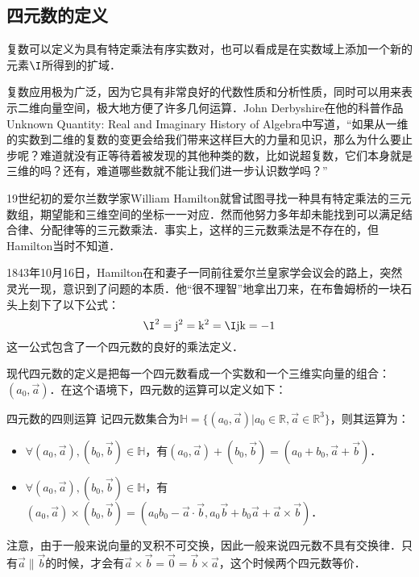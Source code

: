 

\subsection{四元数的定义}

复数可以定义为具有特定乘法有序实数对，也可以看成是在实数域上添加一个新的元素$\I$所得到的扩域．

复数应用极为广泛，因为它具有非常良好的代数性质和分析性质，同时可以用来表示二维向量空间，极大地方便了许多几何运算．John Derbyshire在他的科普作品Unknown Quantity: Real and Imaginary History of Algebra中写道，“如果从一维的实数到二维的复数的变更会给我们带来这样巨大的力量和见识，那么为什么要止步呢？难道就没有正等待着被发现的其他种类的数，比如说超复数，它们本身就是三维的吗？还有，难道哪些数就不能让我们进一步认识数学吗？”

19世纪初的爱尔兰数学家William Hamilton就曾试图寻找一种具有特定乘法的三元数组，期望能和三维空间的坐标一一对应．然而他努力多年却未能找到可以满足结合律、分配律等的三元数乘法．事实上，这样的三元数乘法是不存在的，但Hamilton当时不知道．

1843年10月16日，Hamilton在和妻子一同前往爱尔兰皇家学会议会的路上，突然灵光一现，意识到了问题的本质．他“很不理智”地拿出刀来，在布鲁姆桥的一块石头上刻下了以下公式：$$\I^2=\mathrm{j}^2=\mathrm{k}^2=\I\mathrm{j}\mathrm{k}=-1$$这一公式包含了一个四元数的良好的乘法定义．

现代四元数的定义是把每一个四元数看成一个实数和一个三维实向量的组合：$(a_0, \vec{a})$．在这个语境下，四元数的运算可以定义如下：

\begin{definition}{四元数的四则运算}
记四元数集合为$\mathbb{H}=\{(a_0, \vec{a})|a_0\in\mathbb{R}, \vec{a}\in\mathbb{R}^3\}$，则其运算为：
\begin{itemize}
\item $\forall(a_0, \vec{a}), (b_0, \vec{b})\in\mathbb{H}$，有$(a_0, \vec{a})+ (b_0, \vec{b})=(a_0+b_0, \vec{a}+\vec{b})$．
\item $\forall(a_0, \vec{a}), (b_0, \vec{b})\in\mathbb{H}$，有$(a_0, \vec{a})\times (b_0, \vec{b})=(a_0b_0-\vec{a}\cdot\vec{b}, a_0\vec{b}+b_0\vec{a}+\vec{a}\times\vec{b})$．

\end{itemize}

\end{definition}

注意，由于一般来说向量的叉积不可交换，因此一般来说四元数不具有交换律．只有$\vec{a}\parallel\vec{b}$的时候，才会有$\vec{a}\times\vec{b}=\vec{0}=\vec{b}\times\vec{a}$，这个时候两个四元数等价．

